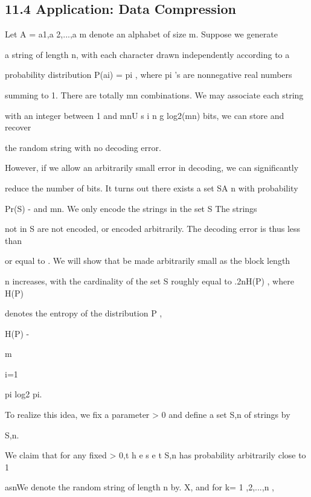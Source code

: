 \subsection*{11.4 Application: Data Compression}

Let A ={ a1,a 2,...,a m} denote an alphabet of size m. Suppose we generate

a string of length n, with each character drawn independently according to a

probability distribution P(ai) = pi , where pi 's are nonnegative real numbers

summing to 1. There are totally mn combinations. We may associate each string

with an integer between 1 and mnU s i n g log2(mn) bits, we can store and recover

the random string with no decoding error.

However, if we allow an arbitrarily small error in decoding, we can significantly

reduce the number of bits. It turns out there exists a set S\subset A n with probability

Pr(S) - \epsilon and \vertS\vert\ll mn. We only encode the strings in the set S The strings

not in S are not encoded, or encoded arbitrarily. The decoding error is thus less than

or equal to \epsilon. We will show that \epsiloncan be made arbitrarily small as the block length

n increases, with the cardinality of the set S roughly equal to .2nH(P) , where H(P)

denotes the entropy of the distribution P ,

H(P) \coloneqq-

m\sum

i=1

pi log2 pi.

To realize this idea, we fix a parameter \delta> 0 and define a set S\delta,n of strings by

S\delta,n.

We claim that for any fixed \delta> 0,t h e s e t S\delta,n has probability arbitrarily close to 1

asn\to\infty We denote the random string of length n by. X, and for k= 1 ,2,...,n ,


